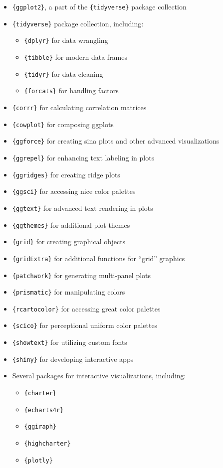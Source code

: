 \documentclass[
  letterpaper,
  DIV=11,
  numbers=noendperiod]{scrreprt}
\providecommand{\tightlist}{%
  \setlength{\itemsep}{0pt}\setlength{\parskip}{0pt}}\usepackage{longtable,booktabs,array}
\begin{document}
\begin{itemize}
\tightlist
\item
  \texttt{\{ggplot2\}}, a part of the \texttt{\{tidyverse\}} package
  collection
\item
  \texttt{\{tidyverse\}} package collection, including:

  \begin{itemize}
  \tightlist
  \item
    \texttt{\{dplyr\}} for data wrangling
  \item
    \texttt{\{tibble\}} for modern data frames
  \item
    \texttt{\{tidyr\}} for data cleaning
  \item
    \texttt{\{forcats\}} for handling factors
  \end{itemize}
\item
  \texttt{\{corrr\}} for calculating correlation matrices
\item
  \texttt{\{cowplot\}} for composing ggplots
\item
  \texttt{\{ggforce\}} for creating sina plots and other advanced
  visualizations
\item
  \texttt{\{ggrepel\}} for enhancing text labeling in plots
\item
  \texttt{\{ggridges\}} for creating ridge plots
\item
  \texttt{\{ggsci\}} for accessing nice color palettes
\item
  \texttt{\{ggtext\}} for advanced text rendering in plots
\item
  \texttt{\{ggthemes\}} for additional plot themes
\item
  \texttt{\{grid\}} for creating graphical objects
\item
  \texttt{\{gridExtra\}} for additional functions for ``grid'' graphics
\item
  \texttt{\{patchwork\}} for generating multi-panel plots
\item
  \texttt{\{prismatic\}} for manipulating colors
\item
  \texttt{\{rcartocolor\}} for accessing great color palettes
\item
  \texttt{\{scico\}} for perceptional uniform color palettes
\item
  \texttt{\{showtext\}} for utilizing custom fonts
\item
  \texttt{\{shiny\}} for developing interactive apps
\item
  Several packages for interactive visualizations, including:

  \begin{itemize}
  \tightlist
  \item
    \texttt{\{charter\}}
  \item
    \texttt{\{echarts4r\}}
  \item
    \texttt{\{ggiraph\}}
  \item
    \texttt{\{highcharter\}}
  \item
    \texttt{\{plotly\}}
  \end{itemize}
\end{itemize}
\end{document}
